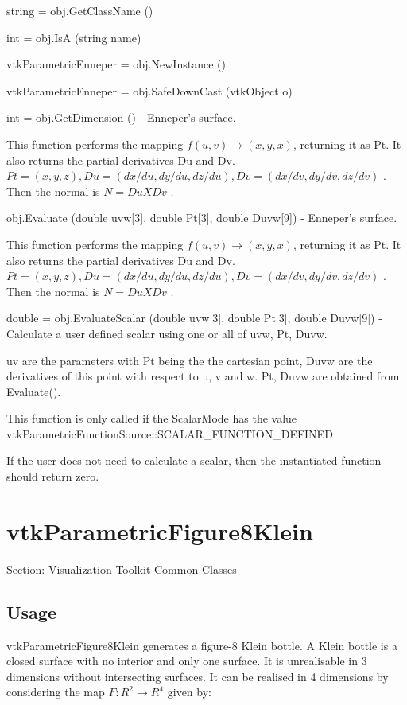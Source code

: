 \begin{DoxyItemize}
\item {\ttfamily string = obj.\-Get\-Class\-Name ()}  
\item {\ttfamily int = obj.\-Is\-A (string name)}  
\item {\ttfamily vtk\-Parametric\-Enneper = obj.\-New\-Instance ()}  
\item {\ttfamily vtk\-Parametric\-Enneper = obj.\-Safe\-Down\-Cast (vtk\-Object o)}  
\item {\ttfamily int = obj.\-Get\-Dimension ()} -\/ Enneper's surface.

This function performs the mapping $f(u,v) \rightarrow (x,y,x)$, returning it as Pt. It also returns the partial derivatives Du and Dv. $Pt = (x, y, z), Du = (dx/du, dy/du, dz/du), Dv = (dx/dv, dy/dv, dz/dv)$ . Then the normal is $N = Du X Dv$ .  
\item {\ttfamily obj.\-Evaluate (double uvw\mbox{[}3\mbox{]}, double Pt\mbox{[}3\mbox{]}, double Duvw\mbox{[}9\mbox{]})} -\/ Enneper's surface.

This function performs the mapping $f(u,v) \rightarrow (x,y,x)$, returning it as Pt. It also returns the partial derivatives Du and Dv. $Pt = (x, y, z), Du = (dx/du, dy/du, dz/du), Dv = (dx/dv, dy/dv, dz/dv)$ . Then the normal is $N = Du X Dv$ .  
\item {\ttfamily double = obj.\-Evaluate\-Scalar (double uvw\mbox{[}3\mbox{]}, double Pt\mbox{[}3\mbox{]}, double Duvw\mbox{[}9\mbox{]})} -\/ Calculate a user defined scalar using one or all of uvw, Pt, Duvw.

uv are the parameters with Pt being the the cartesian point, Duvw are the derivatives of this point with respect to u, v and w. Pt, Duvw are obtained from Evaluate().

This function is only called if the Scalar\-Mode has the value vtk\-Parametric\-Function\-Source\-::\-S\-C\-A\-L\-A\-R\-\_\-\-F\-U\-N\-C\-T\-I\-O\-N\-\_\-\-D\-E\-F\-I\-N\-E\-D

If the user does not need to calculate a scalar, then the instantiated function should return zero.


\end{DoxyItemize}\hypertarget{vtkcommon_vtkparametricfigure8klein}{}\section{vtk\-Parametric\-Figure8\-Klein}\label{vtkcommon_vtkparametricfigure8klein}
Section\-: \hyperlink{sec_vtkcommon}{Visualization Toolkit Common Classes} \hypertarget{vtkwidgets_vtkxyplotwidget_Usage}{}\subsection{Usage}\label{vtkwidgets_vtkxyplotwidget_Usage}
vtk\-Parametric\-Figure8\-Klein generates a figure-\/8 Klein bottle. A Klein bottle is a closed surface with no interior and only one surface. It is unrealisable in 3 dimensions without intersecting surfaces. It can be realised in 4 dimensions by considering the map $F:R^2 \rightarrow R^4$ given by\-:


